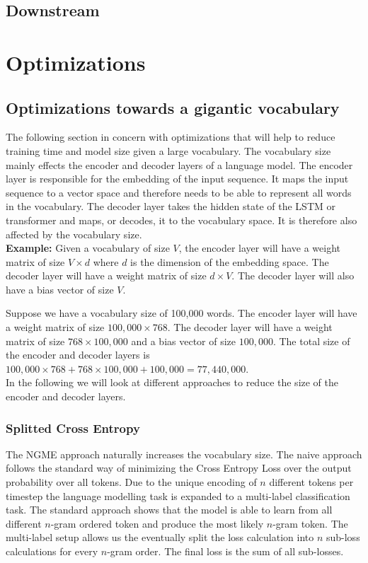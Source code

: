 \documentclass[11pt]{article}
\begin{document}
\subsection{Downstream}

\section{Optimizations}

\subsection{Optimizations towards a gigantic vocabulary}

The following section in concern with optimizations that will help to reduce training time and
model size given a large vocabulary. The vocabulary size mainly effects the encoder and decoder
layers of a language model. The encoder layer is responsible for the embedding of the input
sequence. It maps the input sequence to a vector space and therefore needs to be able to
represent all words in the vocabulary. The decoder layer takes the hidden state of the
LSTM or transformer and maps, or decodes, it to the vocabulary space. It is therefore also affected
by the vocabulary size.\\

\textbf{Example:}
Given a vocabulary of size $V$, the encoder layer will have a weight matrix of size
$V \times d$ where $d$ is the dimension of the embedding space. The decoder layer will have a
weight matrix of size $d \times V$. The decoder layer will also have a bias vector of size $V$.

Suppose we have a vocabulary size of 100,000 words. The encoder layer will have a weight matrix
of size $100,000 \times 768$. The decoder layer will have a weight matrix of size $768 \times 100,000$
and a bias vector of size $100,000$. The total size of the encoder and decoder layers is
$100,000 \times 768 + 768 \times 100,000 + 100,000 = 77,440,000$.\\

In the following we will look at different approaches to reduce the size of the encoder and decoder
layers.

\subsubsection{Splitted Cross Entropy}

The NGME approach naturally increases the vocabulary size. The naive approach follows the standard
way of minimizing the Cross Entropy Loss over the output probability over all tokens. Due to
the unique encoding of $n$ different tokens per timestep the language modelling task is 
expanded to a multi-label classification task. The standard approach shows that the model 
is able to learn from all different $n$-gram ordered token and produce the most likely $n$-gram token.
The multi-label setup allows us the eventually split the loss calculation into $n$ sub-loss calculations
for every $n$-gram order. The final loss is the sum of all sub-losses.
\end{document}
